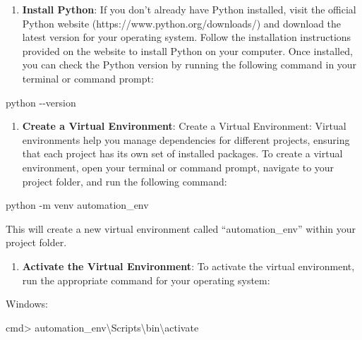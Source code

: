 \documentclass[
  paper=a4,
  ,captions=tableheading
]{scrartcl}
\newenvironment{Shaded}{}{}
\newcommand{\AttributeTok}[1]{\textcolor[rgb]{0.49,0.56,0.16}{#1}}
\newcommand{\ExtensionTok}[1]{#1}
\newcommand{\NormalTok}[1]{#1}
\providecommand{\tightlist}{%
  \setlength{\itemsep}{0pt}\setlength{\parskip}{0pt}}
\begin{document}
\begin{enumerate}
\def\labelenumi{\arabic{enumi}.}
\tightlist
\item
  \textbf{Install Python}: If you don't already have Python installed,
  visit the official Python website (https://www.python.org/downloads/)
  and download the latest version for your operating system. Follow the
  installation instructions provided on the website to install Python on
  your computer. Once installed, you can check the Python version by
  running the following command in your terminal or command prompt:
\end{enumerate}

\begin{Shaded}
\begin{Highlighting}[]
\ExtensionTok{python} \AttributeTok{{-}{-}version}
\end{Highlighting}
\end{Shaded}

\begin{enumerate}
\def\labelenumi{\arabic{enumi}.}
\tightlist
\item
  \textbf{Create a Virtual Environment}: Create a Virtual Environment:
  Virtual environments help you manage dependencies for different
  projects, ensuring that each project has its own set of installed
  packages. To create a virtual environment, open your terminal or
  command prompt, navigate to your project folder, and run the following
  command:
\end{enumerate}

\begin{Shaded}
\begin{Highlighting}[]
\ExtensionTok{python} \AttributeTok{{-}m}\NormalTok{ venv automation\_env}
\end{Highlighting}
\end{Shaded}

This will create a new virtual environment called ``automation\_env''
within your project folder.

\begin{enumerate}
\def\labelenumi{\arabic{enumi}.}
\tightlist
\item
  \textbf{Activate the Virtual Environment}: To activate the virtual
  environment, run the appropriate command for your operating system:
\end{enumerate}

Windows:

\begin{Shaded}
\begin{Highlighting}[]
\NormalTok{cmd\textgreater{} automation\_env\textbackslash{}Scripts\textbackslash{}bin\textbackslash{}activate}
\end{Highlighting}
\end{Shaded}
\end{document}
